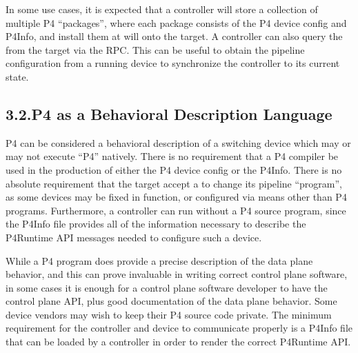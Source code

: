 \documentclass[11pt]{article}
\begin{document}
{%
In some use cases, it is expected that a controller will store a
collection of multiple P4 \textquotedblleft{}packages\textquotedblright{}, where each package consists of
the P4 device config and P4Info, and install them at will onto the target. A
controller can also query the  from the target via the
 RPC. This can be useful to obtain the pipeline
configuration from a running device to synchronize the controller to its current
state.%

\subsection{3.2.\hspace*{0.5em}P4 as a Behavioral Description Language}\label{sec-p4-as-behavioral-description-language}%

\noindent{}P4 can be considered a behavioral description of a switching device which may or
may not execute \textquotedblleft{}P4\textquotedblright{} natively. There is no requirement that a P4 compiler be
used in the production of either the P4 device config or the P4Info. There is no
absolute requirement that the target accept a  to
change its pipeline \textquotedblleft{}program\textquotedblright{}, as some devices may be fixed in function, or
configured via means other than P4 programs. Furthermore, a controller can run
without a P4 source program, since the P4Info file provides all of the
information necessary to describe the P4Runtime API messages needed to configure
such a device.%

While a P4 program does provide a precise description of the data plane
behavior, and this can prove invaluable in writing correct control plane
software, in some cases it is enough for a control plane software developer to
have the control plane API, plus good documentation of the data plane
behavior. Some device vendors may wish to keep their P4 source code private. The
minimum requirement for the controller and device to communicate properly is a
P4Info file that can be loaded by a controller in order to render the correct
P4Runtime API.%

}
\end{document}
